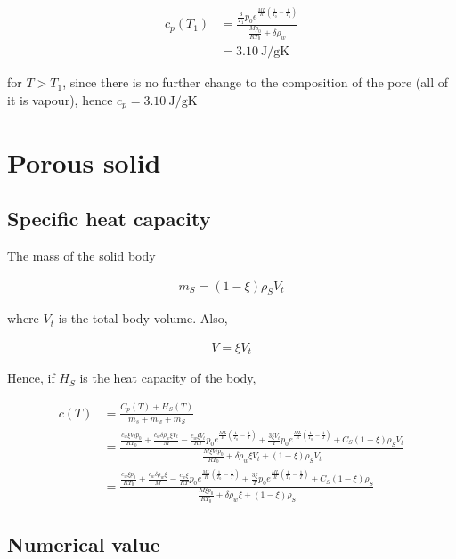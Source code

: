 \documentclass{article}
\begin{document}
\begin{align*}
c_p(T_1) &= \frac
{\frac{3}{T_1}p_0 e^{\frac{ML}{R}\left(\frac{1}{T_0} - \frac{1}{T_1}\right)}}
{\frac{Mp_0}{RT_0} + \delta \rho_w} \\
&= 3.10 \mathrm{\ J/gK}
\end{align*}

for $T > T_1$, since there is no further change to the composition of the pore (all of it is vapour), hence $c_p = 3.10 \mathrm{\ J/gK}$

\section{Porous solid}
\subsection{Specific heat capacity}
The mass of the solid body

\begin{align*}
m_S = (1 - \xi) \rho_S V_t
\end{align*}

where $V_t$ is the total body volume. Also,

\begin{align*}
V = \xi V_t
\end{align*}

Hence, if $H_S$ is the heat capacity of the body,

\begin{align*}
c(T) &= \frac{C_p(T) + H_S(T) }{m_s + m_w + m_S} \\
&= \frac
{\frac{c_w\xi V_tp_0}{RT_0} + \frac{c_w \delta \rho_w \xi V_t}{M} - \frac{c_w \xi V_t}{RT}p_0 e^{\frac{ML}{R}\left(\frac{1}{T_0} - \frac{1}{T}\right)} + \frac{3\xi V_t}{T}p_0 e^{\frac{ML}{R}\left(\frac{1}{T_0} - \frac{1}{T}\right)} + C_S (1 - \xi) \rho_S V_t}
{\frac{M\xi V_tp_0}{RT_0} + \delta \rho_w \xi V_t + (1 - \xi) \rho_S V_t} \\
&= \frac
{\frac{c_w\xi p_0}{RT_0} + \frac{c_w \delta \rho_w \xi }{M} - \frac{c_w \xi }{RT}p_0 e^{\frac{ML}{R}\left(\frac{1}{T_0} - \frac{1}{T}\right)} + \frac{3\xi }{T}p_0 e^{\frac{ML}{R}\left(\frac{1}{T_0} - \frac{1}{T}\right)} + C_S (1 - \xi) \rho_S }
{\frac{M\xi p_0}{RT_0} + \delta \rho_w \xi + (1 - \xi) \rho_S}
\end{align*}

\subsection{Numerical value}
\end{document}
